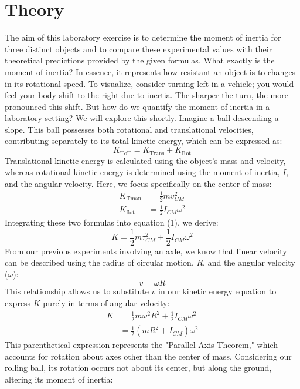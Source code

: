 \documentclass{report}
\begin{document}
    \section{Theory}
    \bigbreak \noindent 
    The aim of this laboratory exercise is to determine the moment of inertia for three distinct objects and to compare these experimental values with their theoretical predictions provided by the given formulas.
    \bigbreak \noindent 
    What exactly is the moment of inertia? In essence, it represents how resistant an object is to changes in its rotational speed. To visualize, consider turning left in a vehicle; you would feel your body shift to the right due to inertia. The sharper the turn, the more pronounced this shift. But how do we quantify the moment of inertia in a laboratory setting? We will explore this shortly.
    \bigbreak \noindent 
    Imagine a ball descending a slope. This ball possesses both rotational and translational velocities, contributing separately to its total kinetic energy, which can be expressed as:
    $$
    K_{\text{ToT}} = K_{\text{Trans}} + K_{\text{Rot}}
    $$
    \bigbreak \noindent 
    Translational kinetic energy is calculated using the object's mass and velocity, whereas rotational kinetic energy is determined using the moment of inertia, \(I\), and the angular velocity. Here, we focus specifically on the center of mass:
    $$
    \begin{aligned}
        K_{\text{Tman}} & = \frac{1}{2} m v_{CM}^2 \\
        K_{\text{flot}} & = \frac{1}{2} I_{CM} \omega^2
    \end{aligned}
    $$
    \bigbreak \noindent 
    Integrating these two formulas into equation (1), we derive:
    $$
    K = \frac{1}{2} m \tau_{CM}^2 + \frac{1}{2} I_{CM} \omega^2
    $$
    \bigbreak \noindent 
    From our previous experiments involving an axle, we know that linear velocity can be described using the radius of circular motion, \(R\), and the angular velocity (\(\omega\)):
    $$
    v = \omega R
    $$
    \bigbreak \noindent 
    This relationship allows us to substitute \(v\) in our kinetic energy equation to express \(K\) purely in terms of angular velocity:
    $$
    \begin{aligned}
        K & = \frac{1}{2} m \omega^2 R^2 + \frac{1}{2} I_{CM} \omega^2 \\
          & = \frac{1}{2}(m R^2 + I_{CM}) \omega^2
    \end{aligned}
    $$
    \bigbreak \noindent 
    This parenthetical expression represents the "Parallel Axis Theorem," which accounts for rotation about axes other than the center of mass. Considering our rolling ball, its rotation occurs not about its center, but along the ground, altering its moment of inertia:
\end{document}
